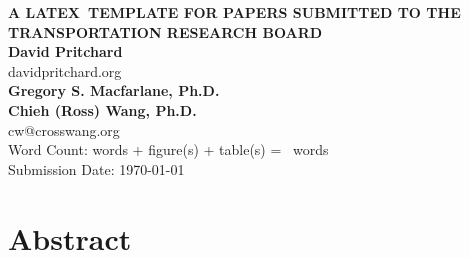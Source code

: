 \documentclass{trb_unofficial}
\author{Pritchard, Macfarlane, and Wang}
\begin{document}
%
%
%
	
\thispagestyle{empty}


\begin{titlepage}
\begin{flushleft}

{\MakeUppercase{\bfseries A \LaTeX\ Template for Papers Submitted to the Transportation
Research Board}}\\[36pt]

{\bfseries David Pritchard} \\
davidpritchard.org\\[12pt]

{\bfseries Gregory S. Macfarlane, Ph.D.}\\[12pt]

{\bfseries Chieh (Ross) Wang, Ph.D.}\\
cw@crosswang.org\\[60pt]

Word Count: \wordcount words +  figure(s) +  table(s) = \totalwordcount~words\\[12pt] 

Submission Date: \today
\end{flushleft}
\end{titlepage}

\pagewiselinenumbers %

\newpage
\section{Abstract}
\end{document}
